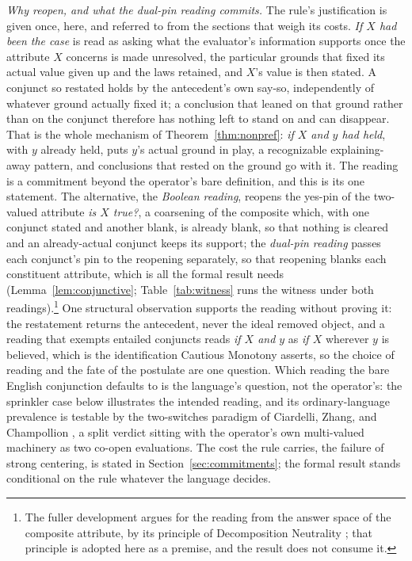 \textit{Why reopen, and what the dual-pin reading commits.}\label{par:whyreopen} The rule's justification is given once, here, and referred to from the sections that weigh its costs. \emph{If $X$ had been the case} is read as asking what the evaluator's information supports once the attribute $X$ concerns is made unresolved, the particular grounds that fixed its actual value given up and the laws retained, and $X$'s value is then stated. A conjunct so restated holds by the antecedent's own say-so, independently of whatever ground actually fixed it; a conclusion that leaned on that ground rather than on the conjunct therefore has nothing left to stand on and can disappear. That is the whole mechanism of Theorem~\ref{thm:nonpref}: \emph{if $X$ and $y$ had held}, with $y$ already held, puts $y$'s actual ground in play, a recognizable explaining-away pattern, and conclusions that rested on the ground go with it. The reading is a commitment beyond the operator's bare definition, and this is its one statement. The alternative, the \emph{Boolean reading}, reopens the yes-pin of the two-valued attribute \emph{is $X$ true?}, a coarsening of the composite which, with one conjunct stated and another blank, is already blank, so that nothing is cleared and an already-actual conjunct keeps its support; the \emph{dual-pin reading} passes each conjunct's pin to the reopening separately, so that reopening blanks each constituent attribute, which is all the formal result needs (Lemma~\ref{lem:conjunctive}; Table~\ref{tab:witness} runs the witness under both readings).\footnote{The fuller development argues for the reading from the answer space of the composite attribute, by its principle of Decomposition Neutrality \parencite{Aethus}; that principle is adopted here as a premise, and the result does not consume it.} One structural observation supports the reading without proving it: the restatement returns the antecedent, never the ideal removed object, and a reading that exempts entailed conjuncts reads \emph{if $X$ and $y$} as \emph{if $X$} wherever $y$ is believed, which is the identification Cautious Monotony asserts, so the choice of reading and the fate of the postulate are one question. Which reading the bare English conjunction defaults to is the language's question, not the operator's: the sprinkler case below illustrates the intended reading, and its ordinary-language prevalence is testable by the two-switches paradigm of Ciardelli, Zhang, and Champollion \parencite*{ciardelli2018}, a split verdict sitting with the operator's own multi-valued machinery as two co-open evaluations. The cost the rule carries, the failure of strong centering, is stated in Section~\ref{sec:commitments}; the formal result stands conditional on the rule whatever the language decides.

